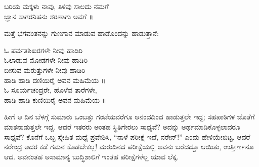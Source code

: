 \begin{myquote}
ಬರಿಯ ಮಕ್ಕಳು ನಾವು, ತಿಳಿವು ಸಾಲದು ನಮಗೆ\\ಜ್ಞಾನ ಸಾಗರನಿಹನು ಶರಣಾಗು ಅವಗೆ ॥
\end{myquote}

\noindent

ಮತ್ತೆ ಭಗವಂತನನ್ನು ಗುಣಗಾನ ಮಾಡುವ ಹಾಡೊಂದನ್ನು ಹಾಡುತ್ತಾನೆ:

\begin{myquote}
ಓ ಪರ್ವತಶಿಖರಗಳೇ ನೀವು ಹಾಡಿರಿ\\ಓಲಾಡುವ ಮೋಡಗಳೇ ನೀವು ಹಾಡಿರಿ\\ಬೀಸುವ ಮರುತ್ತುಗಳೇ ನೀವು ಹಾಡಿರಿ\\ಹಾಡಿ ಹಾಡಿ ದಣಿಯಿರೈ ಅವನ ಮಹಿಮೆಯ ॥\\ಓ ಸೂರ್ಯಚಂದ್ರರೇ, ಹೊಳೆವ ತಾರೆಗಳೇ, \\ಹಾಡಿ ಹಾಡಿ ಕುಣಿಯಿರೈ ಅವನ ಮಹಿಮೆಯ ॥
\end{myquote}

\noindent

ಹೀಗೆ ಆ ದಿನ ಬೆಳಗ್ಗೆ ಸುಮಾರು ಒಂಬತ್ತು ಗಂಟೆಯವರೆಗೂ ಆನಂದದಿಂದ ಹಾಡುತ್ತಲೇ ಇದ್ದ; ಸಹಪಾಠಿಗಳ ಜೊತೆಗೆ ಮಾತನಾಡುತ್ತಲೇ ಇದ್ದ. ಆದರೆ ಇತರರು ಅಂತಹ ಸ್ಥಿತಿಗೇರಲು ಸಾಧ್ಯವೆ? ಅದನ್ನು ಅರ್ಥಮಾಡಿಕೊಳ್ಳಲಾದರೂ ಸಾಧ್ಯವೆ? ಕೊನೆಗೆ ಒಬ್ಬ ಸ್ನೇಹಿತ ಮಧ್ಯೆ ಪ್ರವೇಶಿಸಿ, “ನಾಳೆ ಪರೀಕ್ಷೆ ಇದೆ, ನರೇನ್!” ಎಂದು ಹೇಳಿಯೇಬಿಟ್ಟ. ಆದರೆ ನರೇಂದ್ರ ಅದರ ಕಡೆ ಗಮನ ಕೊಡಬೇಕಲ್ಲ! ಮರುದಿನದ ಪರೀಕ್ಷೆಯಲ್ಲಿ ಅವನು ಬರೆದದ್ದೂ ಆಯಿತು, ಉತ್ತೀರ್ಣನೂ ಆದ. ಅವನಂತಹ ಅಸಾಮಾನ್ಯ ಬುದ್ಧಿಶಾಲಿಗೆ ಇಂತಹ ಪರೀಕ್ಷೆಗಳೆಲ್ಲ ಯಾವ ಲೆಕ್ಕ.


